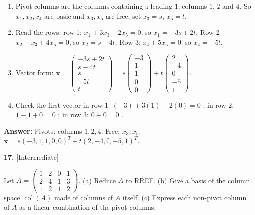 \documentclass[11pt]{article}
\begin{document}
\begin{tcolorbox}[breakable,colback=ans,colframe=ansb,boxrule=0.5pt,left=4pt,right=4pt,top=2pt,bottom=2pt]\begin{enumerate}[leftmargin=2.2em,itemsep=1pt,topsep=1pt,label=\textbf{Step \arabic*.}]\item Pivot columns are the columns containing a leading $1$: columns $1$, $2$ and $4$. So $x_1,x_2,x_4$ are basic and $x_3,x_5$ are free; set $x_3=s$, $x_5=t$.
\item Read the rows: row 1: $x_1+3x_3-2x_5=0$, so $x_1=-3s+2t$. Row 2: $x_2-x_3+4x_5=0$, so $x_2=s-4t$. Row 3: $x_4+5x_5=0$, so $x_4=-5t$.
\item Vector form: $\mathbf x=\begin{pmatrix}-3s+2t\\ s-4t\\ s\\ -5t\\ t\end{pmatrix}=s\begin{pmatrix}-3\\1\\1\\0\\0\end{pmatrix}+t\begin{pmatrix}2\\-4\\0\\-5\\1\end{pmatrix}$.
\item Check the first vector in row 1: $(-3)+3(1)-2(0)=0$ \checkmark; in row 2: $1-1+0=0$ \checkmark; in row 3: $0+0=0$ \checkmark.
\end{enumerate}\textbf{Answer:} Pivots: columns $1,2,4$. Free: $x_3,x_5$. $\mathbf x=s(-3,1,1,0,0)^{T}+t(2,-4,0,-5,1)^{T}$.\end{tcolorbox}
\par\vspace{2pt}
\begin{minipage}{\linewidth}\textbf{17.} \hfill{\scriptsize\color{ink}[Intermediate]}\par\nopagebreak Let $A=\begin{pmatrix}1 & 2 & 0 & 1 \\ 2 & 4 & 1 & 3 \\ 1 & 2 & 1 & 2\end{pmatrix}$. (a) Reduce $A$ to RREF. (b) Give a basis of the column space $\operatorname{col}(A)$ made of columns of $A$ itself. (c) Express each non-pivot column of $A$ as a linear combination of the pivot columns.
\end{minipage}\par\nopagebreak
\end{document}
